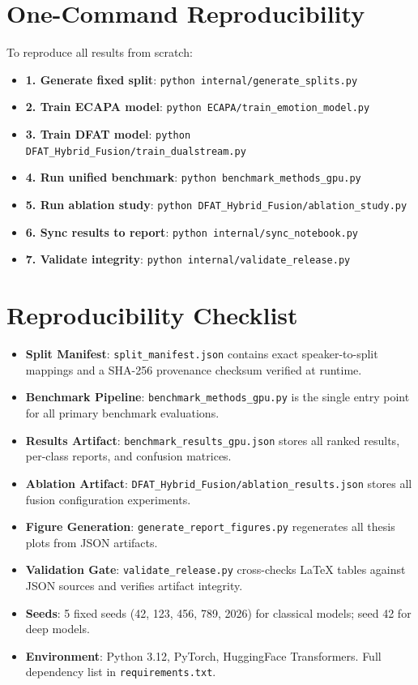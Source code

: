 \documentclass[12pt,a4paper]{report}
\begin{document}
\section{One-Command Reproducibility}

To reproduce all results from scratch:

\begin{itemize}
    \item \textbf{1. Generate fixed split}: \texttt{python internal/generate\_splits.py}
    \item \textbf{2. Train ECAPA model}: \texttt{python ECAPA/train\_emotion\_model.py}
    \item \textbf{3. Train DFAT model}: \texttt{python DFAT\_Hybrid\_Fusion/train\_dualstream.py}
    \item \textbf{4. Run unified benchmark}: \texttt{python benchmark\_methods\_gpu.py}
    \item \textbf{5. Run ablation study}: \texttt{python DFAT\_Hybrid\_Fusion/ablation\_study.py}
    \item \textbf{6. Sync results to report}: \texttt{python internal/sync\_notebook.py}
    \item \textbf{7. Validate integrity}: \texttt{python internal/validate\_release.py}
\end{itemize}

\section{Reproducibility Checklist}
\begin{itemize}
    \item[$\checkmark$] \textbf{Split Manifest}: \texttt{split\_manifest.json} contains exact speaker-to-split mappings and a SHA-256 provenance checksum verified at runtime.
    \item[$\checkmark$] \textbf{Benchmark Pipeline}: \texttt{benchmark\_methods\_gpu.py} is the single entry point for all primary benchmark evaluations.
    \item[$\checkmark$] \textbf{Results Artifact}: \texttt{benchmark\_results\_gpu.json} stores all ranked results, per-class reports, and confusion matrices.
    \item[$\checkmark$] \textbf{Ablation Artifact}: \texttt{DFAT\_Hybrid\_Fusion/ablation\_results.json} stores all fusion configuration experiments.
    \item[$\checkmark$] \textbf{Figure Generation}: \texttt{generate\_report\_figures.py} regenerates all thesis plots from JSON artifacts.
    \item[$\checkmark$] \textbf{Validation Gate}: \texttt{validate\_release.py} cross-checks LaTeX tables against JSON sources and verifies artifact integrity.
    \item[$\checkmark$] \textbf{Seeds}: 5 fixed seeds (42, 123, 456, 789, 2026) for classical models; seed 42 for deep models.
    \item[$\checkmark$] \textbf{Environment}: Python 3.12, PyTorch, HuggingFace Transformers. Full dependency list in \texttt{requirements.txt}.
\end{itemize}
\end{document}

